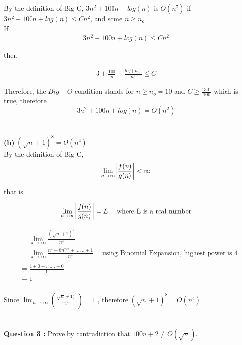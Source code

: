 \documentclass[12pt]{article}
\DeclarePairedDelimiter\abs{\lvert}{\rvert}
\begin{document}
By the definition of Big-O, $3n^2 + 100n + log(n)$ is $O(n^2)$ if $3n^2 + 100n + log(n) \leq Cn^2$, and some $n \geq n_o$\\

If 
\begin{align*}
3n^2 + 100n + log(n) \leq Cn^2
\end{align*}

then 

\begin{align*}
3 + \frac{100}{n} + \frac{log(n)}{n^2} \leq C
\end{align*}

Therefore, the $Big-O$ condition stands for $n \geq n_o = 10$ and $C \geq \frac{1301}{100}$ which is true, therefore 
$$3n^2 + 100n + log(n) = O(n^2) $$\\
\\

\textbf{(b)} $(\sqrt{n} + 1)^8 = O(n^4) $\\

By the definition of Big-O,
\begin{align*}
\lim_{n\to\infty} \abs*{\frac{f(n)}{g(n)}} < \infty \\
\end{align*}

that is

\begin{align*}
\lim_{n\to\infty} \abs*{\frac{f(n)}{g(n)}} = L \text{~~~ where L is a real number}\\
\end{align*}

\begin{align*}
&= \lim_{n\to\infty} \frac{(\sqrt{n} + 1)^8}{n^4} \\[10pt]
&= \lim_{n\to\infty} \frac{n^4+8n^{7/2}+ ....... + 1}{n^4} \text{~~~ using Binomial Expansion, highest power is 4}\\ \\[10pt]
&=  \frac{1+0+ ....... + 0}{1} \\[10pt]
&= 1\\[10pt]
\end{align*}
 
Since $\lim_{n\to\infty} (\frac{\sqrt{n} + 1)^8}{n^4}) = 1$ , therefore  $(\sqrt{n} + 1)^8 = O(n^4)$\\
\\
\\

\textbf{Question 3 : } Prove by contradiction that $100n + 2 \neq O(\sqrt{n}).$\\
\end{document}
